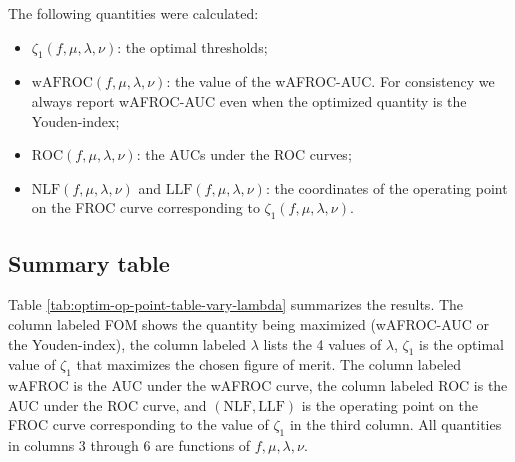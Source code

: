 \documentclass[
]{book}
\begin{document}
The following quantities were calculated:

\begin{itemize}
\item
  \(\zeta_{1} \left ( f, \mu, \lambda, \nu \right )\): the optimal thresholds;
\item
  \(\text{wAFROC} \left (f, \mu, \lambda, \nu \right )\): the value of the wAFROC-AUC. For consistency we always report wAFROC-AUC even when the optimized quantity is the Youden-index;
\item
  \(\text{ROC} \left (f, \mu, \lambda, \nu \right )\): the AUCs under the ROC curves;
\item
  \(\text{NLF} \left (f, \mu, \lambda, \nu \right )\) and \(\text{LLF} \left (f, \mu, \lambda, \nu \right )\): the coordinates of the operating point on the FROC curve corresponding to \(\zeta_{1} \left ( f, \mu, \lambda, \nu \right )\).
\end{itemize}

\hypertarget{summary-table}{%
\subsection{Summary table}\label{summary-table}}

Table \ref{tab:optim-op-point-table-vary-lambda} summarizes the results. The column labeled FOM shows the quantity being maximized (wAFROC-AUC or the Youden-index), the column labeled \(\lambda\) lists the 4 values of \(\lambda\), \(\zeta_1\) is the optimal value of \(\zeta_1\) that maximizes the chosen figure of merit. The column labeled wAFROC is the AUC under the wAFROC curve, the column labeled ROC is the AUC under the ROC curve, and \(\left( \text{NLF}, \text{LLF}\right)\) is the operating point on the FROC curve corresponding to the value of \(\zeta_1\) in the third column. All quantities in columns 3 through 6 are functions of \(f, \mu, \lambda, \nu\).
\end{document}
